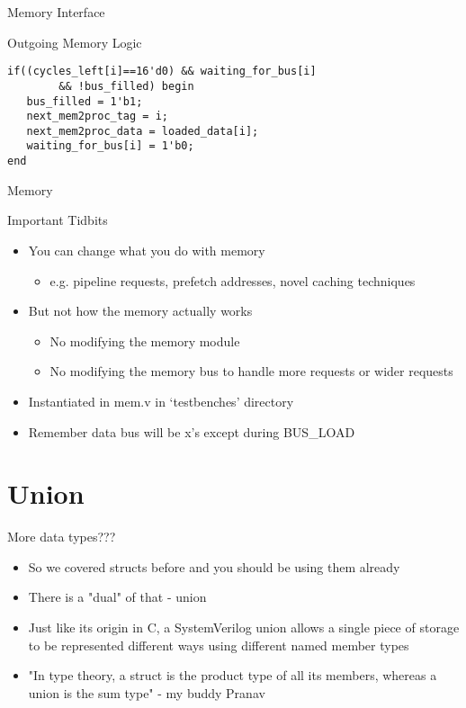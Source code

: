 \documentclass[table,dvipsnames]{beamer}
\begin{document}
\begin{frame}[fragile]{Memory Interface}
	\begin{block}{Outgoing Memory Logic}
		\begin{verbatim}
if((cycles_left[i]==16'd0) && waiting_for_bus[i] 
		&& !bus_filled) begin 
   bus_filled = 1'b1;
   next_mem2proc_tag = i;
   next_mem2proc_data = loaded_data[i];
   waiting_for_bus[i] = 1'b0;
end
		\end{verbatim}
	\end{block}
\end{frame}


\begin{frame}[fragile]{Memory}
	\begin{block}{Important Tidbits}
		\begin{itemize}
			\item You can change what you do with memory
			\begin{itemize}
				\item e.g. pipeline requests, prefetch addresses, novel caching techniques
			\end{itemize}
			\item But not how the memory actually works
			\begin{itemize}
				\item No modifying the memory module
				\item No modifying the memory bus to handle more requests or wider requests
			\end{itemize}
			
			\item Instantiated in mem.v in `testbenches' directory
			\item Remember data bus will be x's except during BUS\_LOAD
		\end{itemize}
	\end{block}
\end{frame}

\section{Union}
\begin{frame}[fragile]{More data types???}
    
    \begin{itemize}
    \item So we covered structs before and you should be using them already
    \item There is a "dual" of that - union
    \item Just like its origin in C, a SystemVerilog union allows a single piece of storage to be represented different ways using different named member types
    \item "In type theory, a struct is the product type of all its members, whereas a union is the sum type" - my buddy Pranav
    \end{itemize}
\end{frame}
\end{document}
